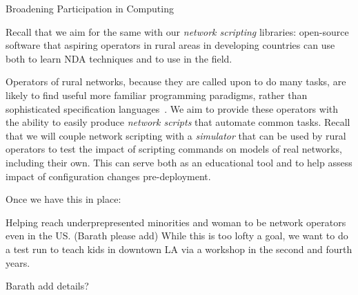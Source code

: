 \documentclass[12pt]{article}
\begin{document}
 \begin{Large}
\begin{center}
Broadening Participation in Computing
\end{center}
\end{Large}

Recall that we aim for the same with our \emph{network scripting} libraries: open-source software that aspiring operators in rural areas in developing countries can use both to learn NDA techniques and to use in the field.

Operators of rural networks, because they are called upon to do many tasks, are likely to find useful more familiar programming paradigms, rather than sophisticated specification languages~\cite{netkat,propane}.  We aim to provide these operators with the ability to easily produce \emph{network scripts} that automate common tasks.  Recall that 
we will couple network scripting with a \emph{simulator} that can be used by rural operators to test the impact of scripting commands on models of real networks, including their own. This can serve both as an educational tool and to help assess impact of configuration changes pre-deployment.

Once we have this in place:

Helping reach underprepresented minorities and woman to be network operators even in the US.  (Barath please add) While this is too lofty a goal, we want to do a test run to teach kids in downtown LA via a workshop in the second and fourth years.

Barath add details?
\end{document}
